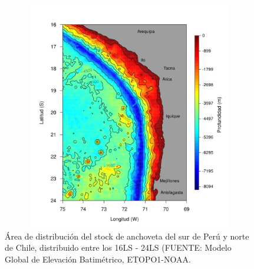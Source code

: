 \documentclass[letter,11pt]{article}
\begin{document}
\vspace{0.5cm}
\begin{figure}[htb!]
 \centering
 \includegraphics[width=14cm,height=10cm]{Figuras/figura1.pdf}
 \caption{\'Area de distribuci\'on del stock de anchoveta del sur de Per\'u y norte de Chile, distribuido entre los 16\degree LS - 24\degree LS (FUENTE: Modelo Global de Elevaci\'on Batim\'etrico, ETOPO1-NOAA.}
 \label{Fig1}
\end{figure}
\end{document}
